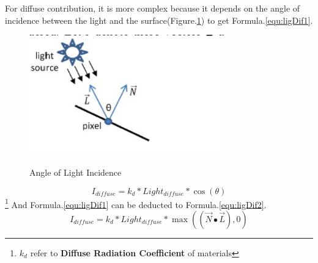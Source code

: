 \documentclass[12pt]{article}
\numberwithin{figure}{subsection}
\numberwithin{table}{subsection}
\numberwithin{equation}{subsection}
\begin{document}
For diffuse contribution, it is more complex because it depends on the angle of
incidence between the light and the surface(Figure.\ref{fig:angle of lighting1}) to get Formula.\ref{equ:ligDif1}.
\begin{figure}[!htbp]
	\centering
	\includegraphics[width=0.75\textwidth]{image/angle of lighting1.png}
	\caption{Angle of Light Incidence}
    \label{fig:angle of lighting1}
    \cite{alma991002986248905076}
\end{figure}
\begin{equation}\label{equ:ligDif1}　
    I_{diffuse}=k_d*Light_{diffuse}*\cos(\theta)
\end{equation}\footnote{$k_d$ refer to \textbf{Diffuse Radiation Coefficient} of materials}
And Formula.\ref{equ:ligDif1} can be deducted to Formula.\ref{equ:ligDif2}.
\begin{equation}\label{equ:ligDif2}　
    I_{diffuse}=k_d*Light_{diffuse}*\max((\overrightarrow{N}\bullet\overrightarrow{L}),0) 
\end{equation}
\end{document}
